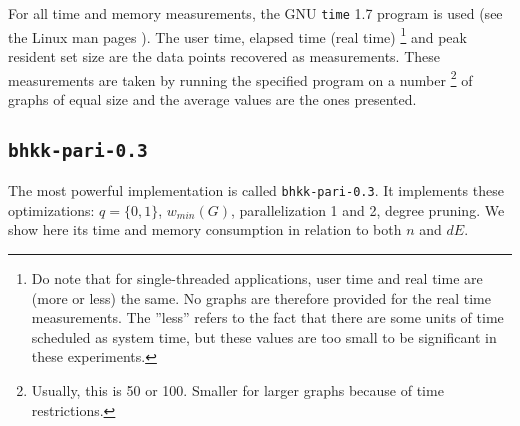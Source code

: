 \documentclass[a4paper]{article}
\newcommand{\code}{\texttt}
\begin{document}
For all time and memory measurements, the GNU \code{time} 1.7 program is used (see the Linux man pages \cite{time}). The user time, elapsed time (real time)
\footnote{Do note that for single-threaded applications, user time and real time are (more or less) the same. No graphs are therefore provided for the real time measurements. The ''less'' refers to the fact that there are some units of time scheduled as system time, but these values are too small to be significant in these experiments.}
and peak resident set size are the data points recovered as measurements. These measurements are taken by running the specified program on a number
\footnote{Usually, this is 50 or 100. Smaller for larger graphs because of time restrictions.} 
of graphs of equal size and the average values are the ones presented.

\subsection{\code{bhkk-pari-0.3}}
The most powerful implementation is called \code{bhkk-pari-0.3}. It implements these optimizations: $q = \{0, 1\}$, $w_{min}(G)$, parallelization 1 and 2, degree pruning. We show here its time and memory consumption in relation to both $n$ and $dE$.
\end{document}
